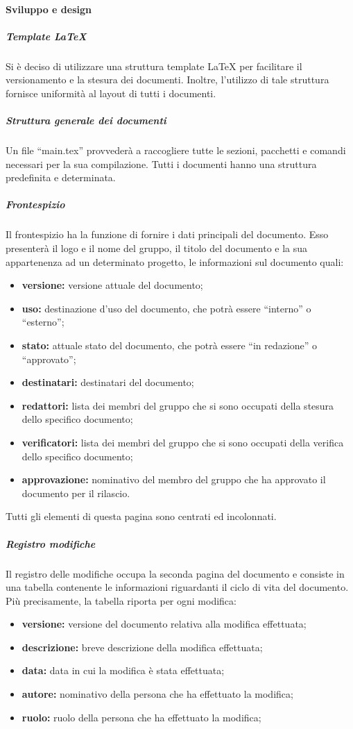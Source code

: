 			\paragraph{Sviluppo e design}
				\subparagraph{Template LaTeX}
					Si è deciso di utilizzare una struttura template \LaTeX{} per facilitare il versionamento e la stesura dei documenti. Inoltre, l'utilizzo di tale struttura fornisce uniformità al layout di tutti i documenti.
				\subparagraph{Struttura generale dei documenti}
					Un file ``main.tex'' provvederà a raccogliere tutte le sezioni, pacchetti e comandi necessari per la sua compilazione. Tutti i documenti hanno una struttura predefinita e determinata.
				\subparagraph{Frontespizio}
					Il frontespizio ha la funzione di fornire i dati principali del documento. Esso presenterà il logo e il nome del gruppo, il titolo del documento e la sua appartenenza ad un determinato progetto, le informazioni sul documento quali:
					\begin{itemize}
						\item \textbf{versione:} versione attuale del documento;
						\item \textbf{uso:} destinazione d'uso del documento, che potrà essere ``interno'' o ``esterno'';
						\item \textbf{stato:} attuale stato del documento, che potrà essere ``in redazione'' o ``approvato'';
						\item \textbf{destinatari:} destinatari del documento;
						\item \textbf{redattori:} lista dei membri del gruppo che si sono occupati della stesura dello specifico documento;
						\item \textbf{verificatori:} lista dei membri del gruppo che si sono occupati della verifica dello specifico documento;
						\item \textbf{approvazione:} nominativo del membro del gruppo che ha approvato il documento per il rilascio.
					\end{itemize}
					Tutti gli elementi di questa pagina sono centrati ed incolonnati.
				\subparagraph{Registro modifiche}
				\label{par: Registro modifiche}
					Il registro delle modifiche occupa la seconda pagina del documento e consiste in una tabella contenente le informazioni riguardanti il ciclo di vita del documento. Più precisamente, la tabella riporta per ogni modifica:
					\begin{itemize}
						\item \textbf{versione:} versione del documento relativa alla modifica effettuata;
						\item \textbf{descrizione:} breve descrizione della modifica effettuata;
						\item \textbf{data:} data in cui la modifica è stata effettuata;
						\item \textbf{autore:} nominativo della persona che ha effettuato la modifica;
						\item \textbf{ruolo:} ruolo della persona che ha effettuato la modifica;
					\end{itemize}
